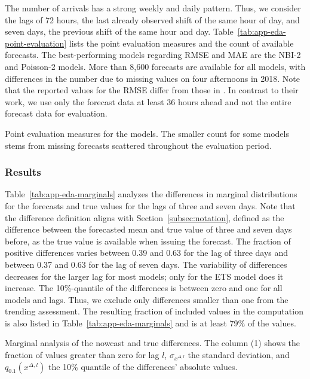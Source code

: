 The number of arrivals has a strong weekly and daily pattern.
Thus, we consider the lags of 72 hours, the last already observed shift of the same hour of day, and seven days, the previous shift of the same hour and day.
Table~\ref{tab:app-eda-point-evaluation} lists the point evaluation measures and the count of available forecasts.
The best-performing models regarding RMSE and MAE are the NBI-2 and Poisson-2 models.
More than 8,600 forecasts are available for all models, with differences in the number due to missing values on four afternoons in 2018.
Note that the reported values for the RMSE differ from those in \textcite{Rostami-Tabar2023}.
In contrast to their work, we use only the forecast data at least 36 hours ahead and not the entire forecast data for evaluation.

\begin{table}
\centering

\caption{Point evaluation measures for the models. The smaller count for some models stems from missing forecasts scattered throughout the evaluation period.}\label{tab:app-eda-point-evaluation}
\end{table}


\subsubsection*{Results}

Table~\ref{tab:app-eda-marginals} analyzes the differences in marginal distributions for the forecasts and true values for the lags of three and seven days.
Note that the difference definition aligns with Section~\ref{subsec:notation}, defined as the difference between the forecasted mean and true value of three and seven days before, as the true value is available when issuing the forecast.
The fraction of positive differences varies between 0.39 and 0.63 for the lag of three days and between 0.37 and 0.63 for the lag of seven days.
The variability of differences decreases for the larger lag for most models; only for the ETS model does it increase.
The 10\%-quantile of the differences is between zero and one for all models and lags.
Thus, we exclude only differences smaller than one from the trending assessment.
The resulting fraction of included values in the computation is also listed in Table~\ref{tab:app-eda-marginals} and is at least 79\% of the values.

\begin{table}
    \centering
    
    \caption{Marginal analysis of the nowcast and true differences. The column (1) shows the fraction of values greater than zero for lag $l$, $\sigma_{x^{\Delta, l}}$ the standard deviation, and $q_{0.1} (x^{\Delta, l})$ the 10\% quantile of the differences' absolute values.}
    \label{tab:app-eda-marginals}
\end{table}

